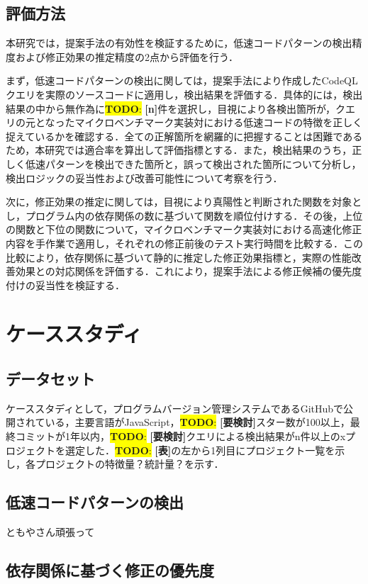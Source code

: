 \documentclass[submit,techrep,noauthor]{ipsj}
\newcommand{\todo}[1]{\colorbox{yellow}{{\bf TODO}:}{\color{red} {\textbf{[#1]}}}}
\begin{document}
\subsection{評価方法}

本研究では，提案手法の有効性を検証するために，低速コードパターンの検出精度および修正効果の推定精度の2点から評価を行う．

まず，低速コードパターンの検出に関しては，提案手法により作成したCodeQLクエリを実際のソースコードに適用し，検出結果を評価する．具体的には，検出結果の中から無作為に\todo{n}件を選択し，目視により各検出箇所が，クエリの元となったマイクロベンチマーク実装対における低速コードの特徴を正しく捉えているかを確認する．全ての正解箇所を網羅的に把握することは困難であるため，本研究では適合率を算出して評価指標とする．また，検出結果のうち，正しく低速パターンを検出できた箇所と，誤って検出された箇所について分析し，検出ロジックの妥当性および改善可能性について考察を行う．

次に，修正効果の推定に関しては，目視により真陽性と判断された関数を対象とし，プログラム内の依存関係の数に基づいて関数を順位付けする．その後，上位の関数と下位の関数について，マイクロベンチマーク実装対における高速化修正内容を手作業で適用し，それぞれの修正前後のテスト実行時間を比較する．この比較により，依存関係に基づいて静的に推定した修正効果指標と，実際の性能改善効果との対応関係を評価する．これにより，提案手法による修正候補の優先度付けの妥当性を検証する．


\section{ケーススタディ}
\label{sec4:format}


\subsection{データセット}

ケーススタディとして，プログラムバージョン管理システムであるGitHubで公開されている，主要言語がJavaScript，\todo{要検討}スター数が100以上，最終コミットが1年以内，\todo{要検討}クエリによる検出結果がn件以上のxプロジェクトを選定した．\todo{表}の左から1列目にプロジェクト一覧を示し，各プロジェクトの特徴量？統計量？を示す．

\subsection{低速コードパターンの検出}
ともやさん頑張って


\subsection{依存関係に基づく修正の優先度}
\label{sec:Item}
\end{document}
